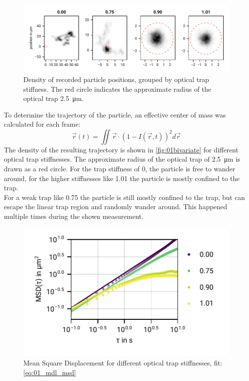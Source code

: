 \documentclass[
    twoside=false,
    twocolumn=true,
    fontsize=11pt,
]{scrarticle}
\begin{document}
\begin{figure}
    \centering
    \includegraphics{figures/01_03_1_bivariate.pdf}
    \caption{Density of recorded particle positions, grouped by optical trap stiffness. The red circle indicates the approximate radius of the optical trap \SI{2.5}{\micro m}.}
    \label{fig:01bivariate}
\end{figure}
To determine the trajectory of the particle, an effective center of mass was calculated for each frame:
\begin{equation}
    \vec{r}(t) = \iint \vec{r} \cdot \left(1-I(\vec{r}, t)\right)^2 d\vec{r}    
\end{equation}
The density of the resulting trajectory is shown in \autoref{fig:01bivariate} for different optical trap stiffnesses.
The approximate radius of the optical trap of \SI{2.5}{\micro m} is drawn as a red circle.
For the trap stiffness of \SI{0}{}, the particle is free to wander around, for the higher stiffnesses like \SI{1.01}{} the particle is mostly confined to the trap.\\
For a weak trap like \SI{0.75}{} the particle is still mostly confined to the trap, but can escape the linear trap region and randomly wander around. 
This happened multiple times during the shown measurement.

\begin{figure}
    \centering
    \includegraphics{figures/01_02_2_msd.pdf}
    \caption{Mean Square Displacement for different optical trap stiffnesses, fit: \autoref{eq:01_mdl_msd}}
    \label{fig:01msd}
\end{figure}
\end{document}
